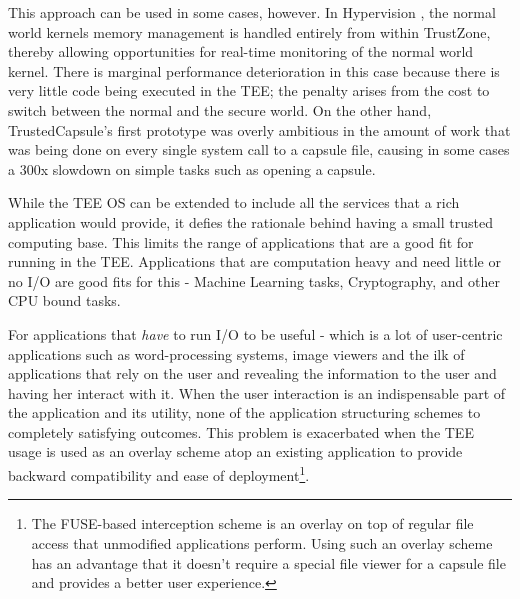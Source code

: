 \begin{enumerate}
    This approach can be used in some cases, however. In Hypervision
    \cite{hypervision}, the normal world kernels memory management is handled
    entirely from within TrustZone, thereby allowing opportunities for real-time
    monitoring of the normal world kernel. There is marginal performance deterioration in this case because there is very little code being executed in the TEE; the penalty arises from the cost to switch between the normal and the secure world. On the other hand, TrustedCapsule's first prototype was overly ambitious in the amount of work that was being done on every single system call to a capsule file, causing in some cases a 300x slowdown on simple tasks such as opening a capsule. 
\end{enumerate}


While the TEE OS can be extended to include all the services that a rich application would provide, it defies the rationale behind having a small trusted computing base. This limits the range of applications that are a good fit for running in the TEE. Applications that are computation heavy and need little or no I/O are good fits for this - Machine Learning tasks, Cryptography, and other CPU bound tasks.

For applications that \emph{have} to run I/O to be useful - which is a lot of user-centric applications such as word-processing systems, image viewers and the ilk of applications that rely on the user and revealing the information to the user and having her interact with it. When the user interaction is an indispensable part of the application and its utility, none of the application structuring schemes to completely satisfying outcomes. This problem is exacerbated when the TEE usage is used as an overlay scheme atop an existing application to provide backward compatibility and ease of deployment\footnote{The FUSE-based interception scheme is an overlay on top of regular file access that unmodified applications perform. Using such an overlay scheme has an advantage that it doesn't require a special file viewer for a capsule file and provides a better user experience. }. 


